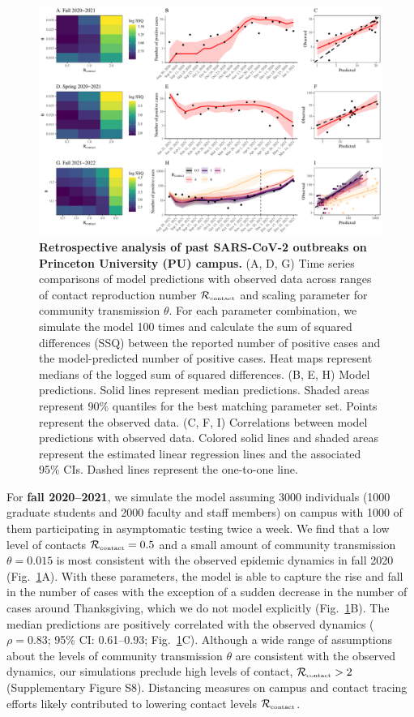 \documentclass[12pt]{article}
\newcommand{\fref}[1]{Fig.~\ref{fig:#1}}
\newcommand{\Rx}[1]{\ensuremath{{\mathcal R}_{#1}}}
\newcommand{\Rc}{\Rx{\textrm{\tiny{contact}}}}
\begin{document}
\begin{figure}[!th]
\includegraphics[width=\textwidth]{../figure_princeton_new/figure_princeton_simulation.pdf}
\caption{
\textbf{Retrospective analysis of past SARS-CoV-2 outbreaks on Princeton University (PU) campus.}
(A, D, G) Time series comparisons of model predictions with observed data across ranges of contact reproduction number $\Rc$ and scaling parameter for community transmission $\theta$.
For each parameter combination, we simulate the model 100 times and calculate the sum of squared differences (SSQ) between the reported number of positive cases and the model-predicted number of positive cases. 
Heat maps represent medians of the logged sum of squared differences.
(B, E, H) Model predictions. 
Solid lines represent median predictions.
Shaded areas represent 90\% quantiles for the best matching parameter set.
Points represent the observed data.
(C, F, I) Correlations between model predictions with observed data.
Colored solid lines and shaded areas represent the estimated linear regression lines and the associated 95\% CIs.
Dashed lines represent the one-to-one line.
\label{fig:matching}
}
\end{figure}

For \textbf{fall 2020--2021}, we simulate the model assuming 3000 individuals (1000 graduate students and 2000 faculty and staff members) on campus with 1000 of them participating in asymptomatic testing twice a week.
We find that a low level of contacts $\Rc=0.5$ and a small amount of community transmission $\theta=0.015$ is most consistent with the observed epidemic dynamics in fall 2020 (\fref{matching}A).
With these parameters, the model is able to capture the rise and fall in the number of cases with the exception of a sudden decrease in the number of cases around Thanksgiving, which we do not model explicitly (\fref{matching}B).
The median predictions are positively correlated with the observed dynamics ($\rho = 0.83$; 95\% CI: 0.61--0.93; \fref{matching}C).
Although a wide range of assumptions about the levels of community transmission $\theta$ are consistent with the observed dynamics, our simulations preclude high levels of contact, $\Rc > 2$ (Supplementary Figure S8).
Distancing measures on campus and contact tracing efforts likely contributed to lowering contact levels $\Rc$.
\end{document}
